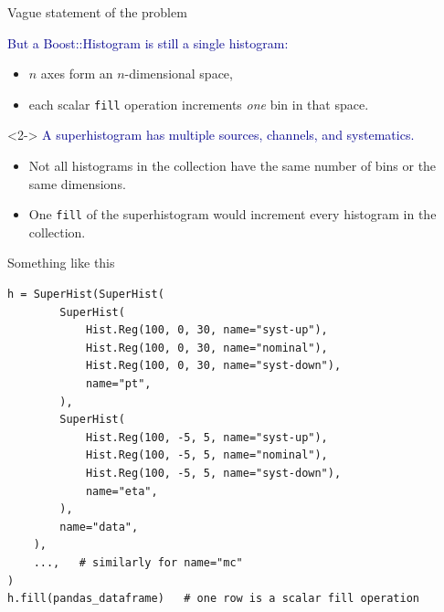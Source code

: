 \documentclass[aspectratio=169]{beamer}
\begin{document}
\begin{frame}{Vague statement of the problem}
\vspace{0.5 cm}
\Large

\textcolor{darkblue}{But a Boost::Histogram is still a single histogram:}

\vspace{0.25 cm}
\begin{itemize}
\item $n$ axes form an $n$-dimensional space,
\item each scalar \texttt{fill} operation increments {\it one} bin in that space.
\end{itemize}

\vspace{0.75 cm}
\begin{uncoverenv}<2->
\textcolor{darkblue}{A superhistogram has multiple sources, channels, and systematics.}

\vspace{0.25 cm}
\begin{itemize}
\item Not all histograms in the collection have the same number of bins or the same dimensions.
\item One \texttt{fill} of the superhistogram would increment every histogram in the collection.
\end{itemize}
\end{uncoverenv}
\end{frame}

\begin{frame}[fragile]{Something like this}
\vspace{0.15 cm}
\small
\begin{verbatim}
h = SuperHist(SuperHist(
        SuperHist(
            Hist.Reg(100, 0, 30, name="syst-up"),
            Hist.Reg(100, 0, 30, name="nominal"),
            Hist.Reg(100, 0, 30, name="syst-down"),
            name="pt",
        ),
        SuperHist(
            Hist.Reg(100, -5, 5, name="syst-up"),
            Hist.Reg(100, -5, 5, name="nominal"),
            Hist.Reg(100, -5, 5, name="syst-down"),
            name="eta",
        ),
        name="data",
    ),
    ...,   # similarly for name="mc"
)
h.fill(pandas_dataframe)   # one row is a scalar fill operation
\end{verbatim}
\end{frame}
\end{document}
